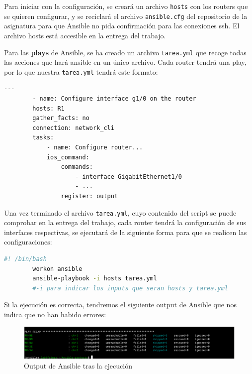 \documentclass[11pt]{article}
\begin{document}
Para iniciar con la configuración, se creará un archivo \texttt{hosts} con los routers que se quieren configurar, y se reciclará el archivo \texttt{ansible.cfg} del repositorio de la asignatura para que Ansible no pida confirmación para las conexiones ssh. El archivo hosts está accesible en la entrega del trabajo. 

Para las \textbf{plays} de Ansible, se ha creado un archivo \texttt{tarea.yml} que recoge todas las acciones que hará ansible en un único archivo. Cada router tendrá una play, por lo que nuestra \texttt{tarea.yml} tendrá este formato:

\begin{tcolorbox}[
    boxrule=0pt,
    title=Formato que seguirá tarea.yml,
]
    \begin{lstlisting}[gobble=6]
        ---
        - name: Configure interface g1/0 on the router 
        hosts: R1
        gather_facts: no 
        connection: network_cli 
        tasks:
            - name: Configure router...
            ios_command:
                commands:
                    - interface GigabitEthernet1/0
                    - ... 
                register: output

    \end{lstlisting}
\end{tcolorbox}

Una vez terminado el archivo \texttt{tarea.yml}, cuyo contenido del script se puede comprobar en la entrega del trabajo, cada router tendrá la configuración de sus interfaces respectivas, se ejecutará de la siguiente forma para que se realicen las configuraciones:

\begin{tcolorbox}[
    boxrule=0pt,
    title=Script de ejecución de Ansible,
]
    \begin{lstlisting}[language=bash, gobble=6]
        #! /bin/bash
        workon ansible
        ansible-playbook -i hosts tarea.yml
        #-i para indicar los inputs que seran hosts y tarea.yml
    \end{lstlisting}
\end{tcolorbox}

Si la ejecución es correcta, tendremos el siguiente output de Ansible que nos indica que no han habido errores:

\begin{figure}[h]
    \centering
    \includegraphics[width=\textwidth]{src/ansible.png}
    \caption{Output de Ansible tras la ejecución}
\end{figure}
\end{document}
